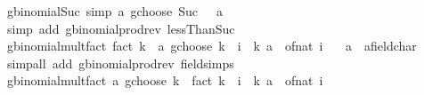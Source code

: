 \begin{isabellebody}
%
\endisadelimproof
\isanewline
{}\isamarkupfalse%
\ gbinomial{\isacharunderscore}{\kern0pt}Suc{}\ {\isacharbrackleft}{\kern0pt}simp{\isacharbrackright}{\kern0pt}{\isacharcolon}{\kern0pt}\ {\isachardoublequoteopen}a\ gchoose\ Suc\ {}\ {\isacharequal}{\kern0pt}\ a{\isachardoublequoteclose}\isanewline
%
\isadelimproof
\ \ %
\endisadelimproof
%
\isatagproof
{}\isamarkupfalse%
\ {\isacharparenleft}{\kern0pt}simp\ add{\isacharcolon}{\kern0pt}\ gbinomial{\isacharunderscore}{\kern0pt}prod{\isacharunderscore}{\kern0pt}rev\ lessThan{\isacharunderscore}{\kern0pt}Suc{\isacharparenright}{\kern0pt}%
\endisatagproof
{\isafoldproof}%
%
\isadelimproof
\isanewline
%
\endisadelimproof
\isanewline
{}\isamarkupfalse%
\ gbinomial{\isacharunderscore}{\kern0pt}mult{\isacharunderscore}{\kern0pt}fact{\isacharcolon}{\kern0pt}\ {\isachardoublequoteopen}fact\ k\ {\isacharasterisk}{\kern0pt}\ {\isacharparenleft}{\kern0pt}a\ gchoose\ k{\isacharparenright}{\kern0pt}\ {\isacharequal}{\kern0pt}\ {\isacharparenleft}{\kern0pt}{\isasymProd}i\ {\isacharequal}{\kern0pt}\ {}{\isachardot}{\kern0pt}{\isachardot}{\kern0pt}{\isacharless}{\kern0pt}k{\isachardot}{\kern0pt}\ a\ {\isacharminus}{\kern0pt}\ of{\isacharunderscore}{\kern0pt}nat\ i{\isacharparenright}{\kern0pt}{\isachardoublequoteclose}\isanewline
\ \ \ a\ {\isacharcolon}{\kern0pt}{\isacharcolon}{\kern0pt}\ {\isachardoublequoteopen}{\isacharprime}{\kern0pt}a{\isacharcolon}{\kern0pt}{\isacharcolon}{\kern0pt}field{\isacharunderscore}{\kern0pt}char{\isacharunderscore}{\kern0pt}{}{\isachardoublequoteclose}\isanewline
%
\isadelimproof
\ \ %
\endisadelimproof
%
\isatagproof
{}\isamarkupfalse%
\ {\isacharparenleft}{\kern0pt}simp{\isacharunderscore}{\kern0pt}all\ add{\isacharcolon}{\kern0pt}\ gbinomial{\isacharunderscore}{\kern0pt}prod{\isacharunderscore}{\kern0pt}rev\ field{\isacharunderscore}{\kern0pt}simps{\isacharparenright}{\kern0pt}%
\endisatagproof
{\isafoldproof}%
%
\isadelimproof
\isanewline
%
\endisadelimproof
\isanewline
{}\isamarkupfalse%
\ gbinomial{\isacharunderscore}{\kern0pt}mult{\isacharunderscore}{\kern0pt}fact{\isacharprime}{\kern0pt}{\isacharcolon}{\kern0pt}\ {\isachardoublequoteopen}{\isacharparenleft}{\kern0pt}a\ gchoose\ k{\isacharparenright}{\kern0pt}\ {\isacharasterisk}{\kern0pt}\ fact\ k\ {\isacharequal}{\kern0pt}\ {\isacharparenleft}{\kern0pt}{\isasymProd}i\ {\isacharequal}{\kern0pt}\ {}{\isachardot}{\kern0pt}{\isachardot}{\kern0pt}{\isacharless}{\kern0pt}k{\isachardot}{\kern0pt}\ a\ {\isacharminus}{\kern0pt}\ of{\isacharunderscore}{\kern0pt}nat\ i{\isacharparenright}{\kern0pt}{\isachardoublequoteclose}\isanewline

\end{isabellebody}
